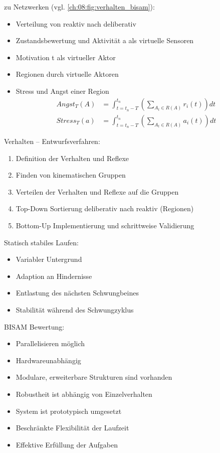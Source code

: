 zu Netzwerken (vgl. \autoref{ch:08:fig:verhalten_bisam}):
\begin{itemize}
	\item Verteilung von reaktiv nach deliberativ
	\item Zustandsbewertung und Aktivität a als virtuelle Sensoren
	\item Motivation t als virtueller Aktor
	\item Regionen durch virtuelle Aktoren
	\item Stress und Angst einer Region
	\begin{align}	
		Angst_T(A) &= \int_{t = t_n - T}^{t_n} \left( \sum_{A_t \in R(A)} r_i\left(t\right)\right) dt \\
		Stress_T(a) &= \int_{t = t_n - T}^{t_n} \left( \sum_{A_t \in R(A)} a_i\left(t\right)\right) dt
	\end{align}
\end{itemize}

Verhalten -- Entwurfsverfahren:
\begin{enumerate}
	\item Definition der Verhalten und Reflexe
	\item Finden von kinematischen Gruppen
	\item Verteilen der Verhalten und Reflexe auf die Gruppen
	\item Top-Down Sortierung deliberativ nach reaktiv (Regionen)
	\item Bottom-Up Implementierung und schrittweise Validierung
\end{enumerate}

Statisch stabiles Laufen:
\begin{itemize}
	\item Variabler Untergrund
	\item Adaption an Hindernisse
	\item Entlastung des nächsten Schwungbeines
	\item Stabilität während des Schwungzyklus
\end{itemize}

BISAM Bewertung:
\begin{itemize}
	\item Parallelisieren möglich
	\item Hardwareunabhängig
	\item Modulare, erweiterbare Strukturen sind vorhanden
	\item Robustheit ist abhängig von Einzelverhalten
	\item System ist prototypisch umgesetzt
	\item Beschränkte Flexibilität der Laufzeit
	\item Effektive Erfüllung der Aufgaben
\end{itemize}

